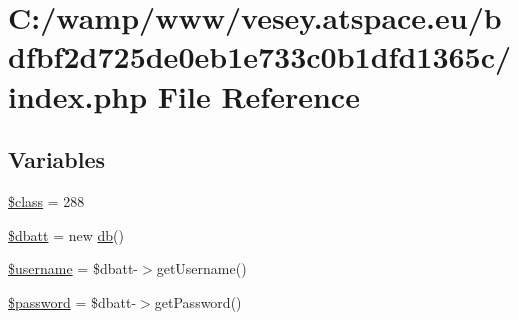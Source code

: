 \hypertarget{bdfbf2d725de0eb1e733c0b1dfd1365c_2index_8php}{\section{C\-:/wamp/www/vesey.atspace.\-eu/bdfbf2d725de0eb1e733c0b1dfd1365c/index.php File Reference}
\label{bdfbf2d725de0eb1e733c0b1dfd1365c_2index_8php}
}
\subsection*{Variables}
\begin{DoxyCompactItemize}
\item 
\hyperlink{bdfbf2d725de0eb1e733c0b1dfd1365c_2index_8php_a252ba022809910ea710a068fc1bab657}{\$class} = 288
\item 
\hyperlink{bdfbf2d725de0eb1e733c0b1dfd1365c_2index_8php_a91a28d35770d3a47412dce6c8059f374}{\$dbatt} = new \hyperlink{classdb}{db}()
\item 
\hyperlink{bdfbf2d725de0eb1e733c0b1dfd1365c_2index_8php_a0eb82aa5f81cf845de4b36cd653c42cf}{\$username} = \$dbatt-\/$>$get\-Username()
\item 
\hyperlink{bdfbf2d725de0eb1e733c0b1dfd1365c_2index_8php_a607686ef9f99ea7c42f4f3dd3dbb2b0d}{\$password} = \$dbatt-\/$>$get\-Password()
\end{DoxyCompactItemize}


